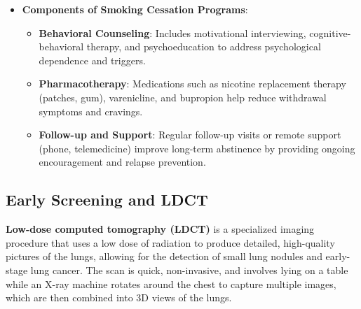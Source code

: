 \begin{itemize}
    \item \textbf{Components of Smoking Cessation Programs}:
        \begin{itemize}
            \item \textbf{Behavioral Counseling}: Includes motivational interviewing, cognitive-
            behavioral therapy, and psychoeducation to address psychological dependence and triggers.

            \item \textbf{Pharmacotherapy}: Medications such as nicotine replacement therapy 
            (patches, gum), varenicline, and bupropion help reduce withdrawal symptoms and cravings.

            \item \textbf{Follow-up and Support}: Regular follow-up visits or remote support 
            (phone, telemedicine) improve long-term abstinence by providing ongoing encouragement 
            and relapse prevention.\cite{Esen2020}
        \end{itemize}
\end{itemize}

\subsection{Early Screening and LDCT}

\textbf{Low-dose computed tomography (LDCT)} is a specialized imaging procedure that uses a low 
dose of radiation to produce detailed, high-quality pictures of the lungs, allowing for the 
detection of small lung nodules and early-stage lung cancer. The scan is quick, non-invasive, and 
involves lying on a table while an X-ray machine rotates around the chest to capture multiple 
images, which are then combined into 3D views of the lungs. 

